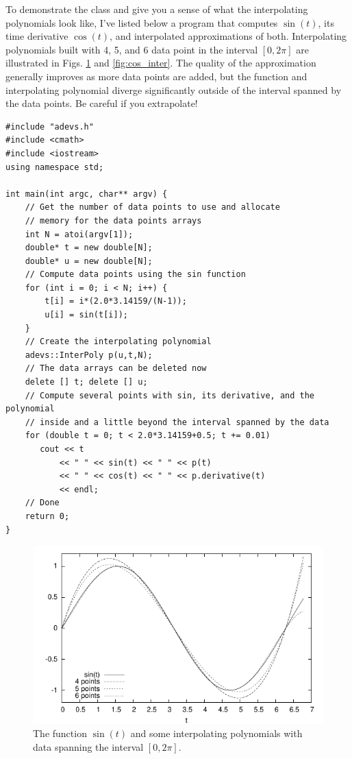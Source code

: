 To demonstrate the  class and give you a sense of what the interpolating polynomials look like, I've listed below a program that computes $\sin(t)$, its time derivative $\cos(t)$, and interpolated approximations of both. Interpolating polynomials built with 4, 5, and 6 data point in the interval $[0,2\pi]$ are illustrated in Figs. \ref{fig:sin_inter} and \ref{fig:cos_inter}. The quality of the approximation generally improves as more data points are added, but the function and interpolating polynomial diverge significantly outside of the interval spanned by the data points. Be careful if you extrapolate! 
\begin{verbatim}
#include "adevs.h"
#include <cmath>
#include <iostream>
using namespace std;

int main(int argc, char** argv) {
    // Get the number of data points to use and allocate 
    // memory for the data points arrays
    int N = atoi(argv[1]);
    double* t = new double[N];
    double* u = new double[N];
    // Compute data points using the sin function
    for (int i = 0; i < N; i++) {
        t[i] = i*(2.0*3.14159/(N-1));
        u[i] = sin(t[i]);
    }
    // Create the interpolating polynomial
    adevs::InterPoly p(u,t,N);
    // The data arrays can be deleted now
    delete [] t; delete [] u;
    // Compute several points with sin, its derivative, and the polynomial
    // inside and a little beyond the interval spanned by the data 
    for (double t = 0; t < 2.0*3.14159+0.5; t += 0.01) 
       cout << t 
           << " " << sin(t) << " " << p(t)
           << " " << cos(t) << " " << p.derivative(t)
           << endl;
    // Done
    return 0;
}
\end{verbatim}
\begin{figure}[ht]
\centering
\includegraphics{interpolation_figs/sin.pdf}
\caption{The function $\sin(t)$ and some interpolating polynomials with data spanning the interval $[0,2\pi]$.}
\label{fig:sin_inter}
\end{figure}
